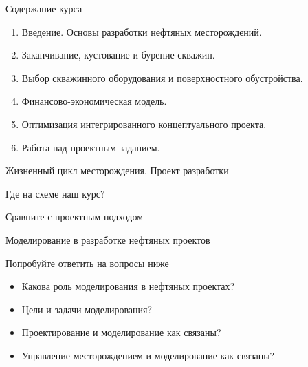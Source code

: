 \begin{frame}{Содержание курса}
\begin{enumerate}
    \item Введение. Основы разработки нефтяных месторождений.
    \item Заканчивание, кустование и бурение скважин.
    \item Выбор скважинного оборудования и поверхностного обустройства.
    \item Финансово-экономическая модель.
    \item Оптимизация интегрированного концептуального проекта. 
    \item Работа над проектным заданием.
\end{enumerate}
\end{frame}

%
\begin{frame}{Жизненный цикл месторождения. Проект разработки}
\begin{center}


Где на схеме наш курс?    

Сравните с проектным подходом

\end{center}


\end{frame}

\begin{frame}{Моделирование в разработке нефтяных проектов}
\begin{center}
    Попробуйте ответить на вопросы ниже
\end{center}
\begin{itemize}
    \item Какова роль моделирования в нефтяных проектах? 
    \item Цели и задачи моделирования?
    \item Проектирование и моделирование как связаны?
    \item Управление месторождением и моделирование как связаны?
\end{itemize}
 
\end{frame}

